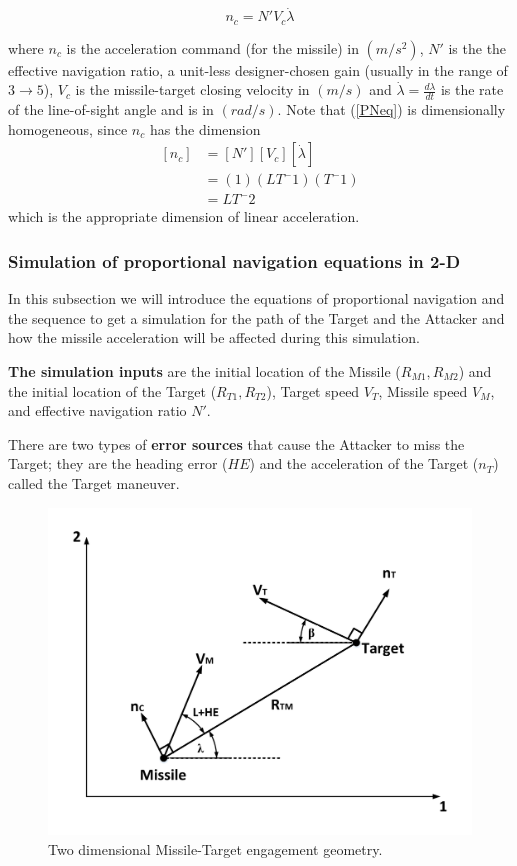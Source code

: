 \begin{equation}
n_c= N' V_c \dot{\lambda}
\label{PNeq}
\end{equation}

where $n_c$ is the acceleration command (for the missile) in $(m/s^2)$, $N'$ is the the effective navigation ratio, a unit-less designer-chosen gain (usually in the range of $3 \to 5$), $V_c$ is the missile-target closing velocity in $(m/s)$ and $\dot{\lambda} = \frac{d\lambda}{dt}$ is the rate of the line-of-sight angle and is in $(rad/s)$. Note that (\ref{PNeq}) is dimensionally homogeneous, since $n_c$ has the dimension
\begin{equation}
\begin{split}
[n_c] &= [N'] [V_c] [\dot{\lambda}]\\
&=(1) (LT^-1) (T^-1)\\
&=LT^-2
\end{split}
\label{PN dimensionallity}
\end{equation}
which is the appropriate dimension of linear acceleration.

\subsubsection{Simulation of proportional navigation equations in 2-D}
\label{PNeqations}
In this subsection we will introduce the equations of proportional navigation and the sequence to get a simulation for the path of the Target and the Attacker and how the missile acceleration will be affected during this simulation.

\textbf{The simulation inputs} are the initial location of the Missile ($R_{M1}, R_{M2}$) and the initial location of the Target ($R_{T1}, R_{T2}$), Target speed $V_T$, Missile speed $V_M$, and effective navigation ratio $N'$.

There are two types of \textbf{error sources} that cause the Attacker to miss the Target; they are the heading error ($HE$) and the acceleration of the Target ($n_T$) called the Target maneuver.

\begin{figure}[htb]
	\centering
	\includegraphics[scale = 0.6]{fig/PN.pdf}
	\caption{Two dimensional Missile-Target engagement geometry.}
	\label{PN}
\end{figure}


